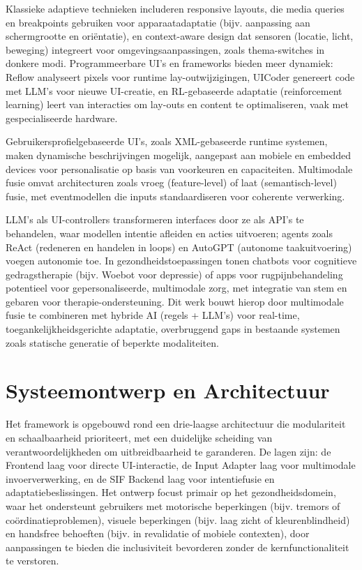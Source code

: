 \documentclass[openany]{book}
\begin{document}
Klassieke adaptieve technieken includeren responsive layouts, die media queries en breakpoints gebruiken voor apparaatadaptatie (bijv. aanpassing aan schermgrootte en oriëntatie), en context-aware design dat sensoren (locatie, licht, beweging) integreert voor omgevingsaanpassingen, zoals thema-switches in donkere modi. Programmeerbare UI's en frameworks bieden meer dynamiek: Reflow analyseert pixels voor runtime lay-outwijzigingen, UICoder genereert code met LLM's voor nieuwe UI-creatie, en RL-gebaseerde adaptatie (reinforcement learning) leert van interacties om lay-outs en content te optimaliseren, vaak met gespecialiseerde hardware.

Gebruikersprofielgebaseerde UI's, zoals XML-gebaseerde runtime systemen, maken dynamische beschrijvingen mogelijk, aangepast aan mobiele en embedded devices voor personalisatie op basis van voorkeuren en capaciteiten. Multimodale fusie omvat architecturen zoals vroeg (feature-level) of laat (semantisch-level) fusie, met eventmodellen die inputs standaardiseren voor coherente verwerking.

LLM's als UI-controllers transformeren interfaces door ze als API's te behandelen, waar modellen intentie afleiden en acties uitvoeren; agents zoals ReAct (redeneren en handelen in loops) en AutoGPT (autonome taakuitvoering) voegen autonomie toe. In gezondheidstoepassingen tonen chatbots voor cognitieve gedragstherapie (bijv. Woebot voor depressie) of apps voor rugpijnbehandeling potentieel voor gepersonaliseerde, multimodale zorg, met integratie van stem en gebaren voor therapie-ondersteuning.
Dit werk bouwt hierop door multimodale fusie te combineren met hybride AI (regels + LLM's) voor real-time, toegankelijkheidsgerichte adaptatie, overbruggend gaps in bestaande systemen zoals statische generatie of beperkte modaliteiten.

\section*{Systeemontwerp en Architectuur}
Het framework is opgebouwd rond een drie-laagse architectuur die modulariteit en schaalbaarheid prioriteert, met een duidelijke scheiding van verantwoordelijkheden om uitbreidbaarheid te garanderen. De lagen zijn: de Frontend laag voor directe UI-interactie, de Input Adapter laag voor multimodale invoerverwerking, en de SIF Backend laag voor intentiefusie en adaptatiebeslissingen. Het ontwerp focust primair op het gezondheidsdomein, waar het ondersteunt gebruikers met motorische beperkingen (bijv. tremors of coördinatieproblemen), visuele beperkingen (bijv. laag zicht of kleurenblindheid) en handsfree behoeften (bijv. in revalidatie of mobiele contexten), door aanpassingen te bieden die inclusiviteit bevorderen zonder de kernfunctionaliteit te verstoren.
\end{document}
